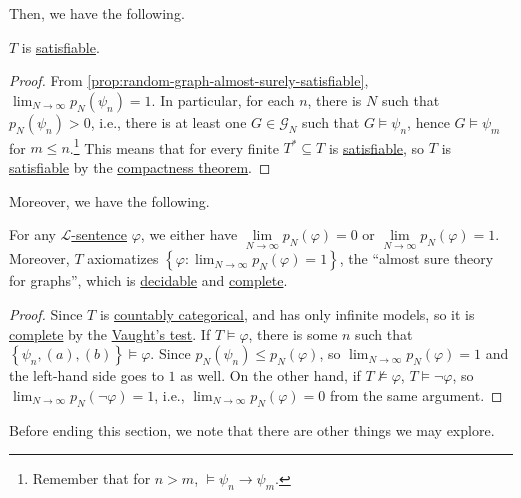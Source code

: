Then, we have the following.

\begin{theorem}
	\(T\) is \hyperref[def:satisfiable]{satisfiable}.
\end{theorem}
\begin{proof}
	From \autoref{prop:random-graph-almost-surely-satisfiable}, \(\lim_{N \to \infty} p_N(\psi _n) = 1\). In particular, for each \(n\), there is \(N\) such that \(p_N(\psi _n) > 0\), i.e., there is at least one \(G\in \mathcal{G} _N\) such that \(G \models \psi _n\), hence \(G\models \psi _m\) for \(m \leq n\).\footnote{Remember that for \(n > m\), \(\models \psi _n \to \psi _m\).} This means that for every finite \(T^{\ast} \subseteq T\) is \hyperref[def:satisfiable]{satisfiable}, so \(T\) is \hyperref[def:satisfiable]{satisfiable} by the \hyperref[thm:compactness]{compactness theorem}.
\end{proof}

Moreover, we have the following.

\begin{theorem}\label{thm:0-1-law-for-graph}
	For any \hyperref[def:sentence]{\(\mathcal{L} \)-sentence} \(\varphi \), we either have \(\lim\limits_{N \to \infty} p_N(\varphi ) = 0 \) or \(\lim\limits_{N \to \infty} p_N(\varphi )=1\). Moreover, \(T\) axiomatizes \(\left\{ \varphi \colon \lim_{N \to \infty} p_N(\varphi ) = 1 \right\} \), the ``almost sure theory for graphs'', which is \hyperref[def:decidable]{decidable} and \hyperref[def:theory-complete]{complete}.
\end{theorem}
\begin{proof}
	Since \(T\) is \hyperref[def:countably-categorical]{countably categorical}, and has only infinite models, so it is \hyperref[def:theory-complete]{complete} by the \hyperref[thm:Vaught-test]{Vaught's test}. If \(T \models \varphi \), there is some \(n\) such that \(\left\{ \psi _n, \hyperref[def:random-graph-theory-a]{(a)}, \hyperref[def:random-graph-theory-a]{(b)} \right\} \models \varphi \). Since \(p_N(\psi _n) \leq p_N(\varphi )\), so \(\lim_{N \to \infty} p_N(\varphi ) = 1\) and the left-hand side goes to \(1\) as well. On the other hand, if \(T \not \models \varphi \), \(T \models \lnot \varphi \), so \(\lim_{N \to \infty} p_N(\lnot \varphi ) = 1\), i.e., \(\lim_{N \to \infty} p_N(\varphi ) = 0\) from the same argument.
\end{proof}

Before ending this section, we note that there are other things we may explore.

